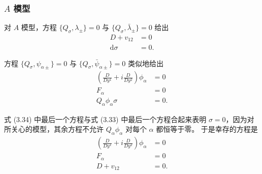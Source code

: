 \subsubsection*{$A$ 模型}

对 $A$ 模型，方程 $\{Q_\sigma,\lambda_\pm\}=0$ 与 $\{Q_\sigma,\bar\lambda_\pm\}=0$ 给出
\begin{equation}
\begin{aligned}
D+v_{12} &= 0\\
\mathrm{d}\sigma &= 0.
\end{aligned}
\tag{3.33}
\end{equation}

方程 $\{Q_\sigma,\psi_{\alpha\pm}\}=0$ 与 $\{Q_\sigma,\bar\psi_{\alpha\pm}\}=0$ 类似地给出
\begin{equation}
\begin{aligned}
\left(\frac{D}{Dy^1}+i\frac{D}{Dy^2}\right)\phi_\alpha &= 0\\
F_\alpha &= 0\\
Q_\alpha\phi_\alpha\sigma &= 0.
\end{aligned}
\tag{3.34}
\end{equation}

式 (3.34) 中最后一个方程与式 (3.33) 中最后一个方程合起来表明 $\sigma=0$，因为对所关心的模型，其余方程不允许 $Q_\alpha\phi_\alpha$ 对每个 $\alpha$ 都恒等于零。
\label{op:37}
于是幸存的方程是
\begin{equation}
\begin{aligned}
\left(\frac{D}{Dy^1}+i\frac{D}{Dy^2}\right)\phi_\alpha &= 0\\
F_\alpha &= 0\\
D+v_{12} &= 0.
\end{aligned}
\tag{3.35}
\end{equation}

